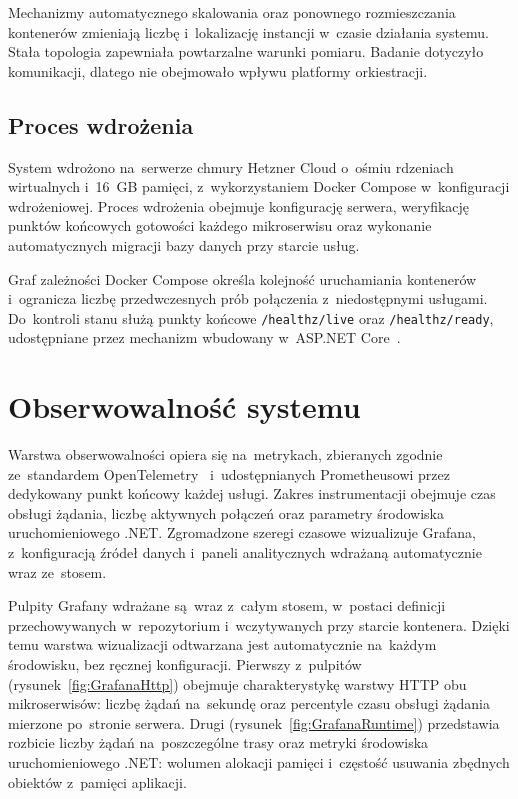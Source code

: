 Mechanizmy automatycznego skalowania oraz ponownego rozmieszczania kontenerów zmieniają liczbę i~lokalizację instancji w~czasie działania systemu. Stała topologia zapewniała powtarzalne warunki pomiaru. Badanie dotyczyło komunikacji, dlatego nie obejmowało wpływu platformy orkiestracji.

\subsection{Proces wdrożenia}
\label{subsec:Deployment}

System wdrożono na~serwerze chmury Hetzner Cloud o~ośmiu rdzeniach wirtualnych i~16~GB pamięci, z~wykorzystaniem Docker Compose w~konfiguracji wdrożeniowej. Proces wdrożenia obejmuje konfigurację serwera, weryfikację punktów końcowych gotowości każdego mikroserwisu oraz wykonanie automatycznych migracji bazy danych przy starcie usług.

Graf zależności Docker Compose określa kolejność uruchamiania kontenerów i~ogranicza liczbę przedwczesnych prób połączenia z~niedostępnymi usługami. Do~kontroli stanu służą punkty końcowe \texttt{/healthz/live} oraz \texttt{/healthz/ready}, udostępniane przez mechanizm wbudowany w~ASP.NET Core~\cite{bib:MicrosoftDocs2024}.

\section{Obserwowalność systemu}
\label{sec:Observability}

Warstwa obserwowalności opiera się na~metrykach, zbieranych zgodnie ze~standardem OpenTelemetry~\cite{bib:OpenTelemetry2024} i~udostępnianych Prometheusowi przez dedykowany punkt końcowy każdej usługi. Zakres instrumentacji obejmuje czas obsługi żądania, liczbę aktywnych połączeń oraz parametry środowiska uruchomieniowego .NET. Zgromadzone szeregi czasowe wizualizuje Grafana, z~konfiguracją źródeł danych i~paneli analitycznych wdrażaną automatycznie wraz ze~stosem.

Pulpity Grafany wdrażane są~wraz z~całym stosem, w~postaci definicji przechowywanych w~repozytorium i~wczytywanych przy starcie kontenera. Dzięki temu warstwa wizualizacji odtwarzana jest automatycznie na~każdym środowisku, bez ręcznej konfiguracji. Pierwszy z~pulpitów (rysunek~\ref{fig:GrafanaHttp}) obejmuje charakterystykę warstwy HTTP obu mikroserwisów: liczbę żądań na~sekundę oraz percentyle czasu obsługi żądania mierzone po~stronie serwera. Drugi (rysunek~\ref{fig:GrafanaRuntime}) przedstawia rozbicie liczby żądań na~poszczególne trasy oraz metryki środowiska uruchomieniowego .NET: wolumen alokacji pamięci i~częstość usuwania zbędnych obiektów z~pamięci aplikacji.

